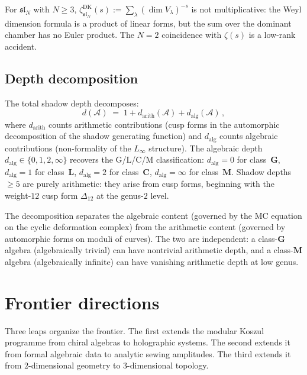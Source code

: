 \documentclass[11pt,reqno]{amsart}
\theoremstyle{definition}
\theoremstyle{remark}
\providecommand{\cA}{\mathcal{A}}
\numberwithin{equation}{section}
\begin{document}
For $\mathfrak{sl}_N$ with $N \ge 3$,
$\zeta^{\mathrm{DK}}_{\mathfrak{sl}_N}(s) :=
\sum_\lambda (\dim V_\lambda)^{-s}$ is not
multiplicative: the Weyl dimension formula is a product
of linear forms, but the sum over the dominant chamber
has no Euler product. The $N = 2$ coincidence with
$\zeta(s)$ is a low-rank accident.

\subsection{Depth decomposition}
\label{ssec:depth}

The total shadow depth decomposes:
\begin{equation}\label{eq:depth-decomposition}
d(\cA)
\;=\;
1 + d_{\mathrm{arith}}(\cA) + d_{\mathrm{alg}}(\cA)\,,
\end{equation}
where $d_{\mathrm{arith}}$ counts arithmetic contributions
(cusp forms in the automorphic decomposition of the shadow
generating function) and $d_{\mathrm{alg}}$ counts
algebraic contributions (non-formality of the $L_\infty$
structure). The algebraic depth
$d_{\mathrm{alg}} \in \{0, 1, 2, \infty\}$ recovers
the G/L/C/M classification: $d_{\mathrm{alg}} = 0$
for class~$\mathbf{G}$, $d_{\mathrm{alg}} = 1$ for
class~$\mathbf{L}$, $d_{\mathrm{alg}} = 2$ for
class~$\mathbf{C}$,
$d_{\mathrm{alg}} = \infty$ for class~$\mathbf{M}$.
Shadow depths $\ge 5$ are purely arithmetic: they arise
from cusp forms, beginning with the weight-$12$ cusp
form $\Delta_{12}$ at the genus-$2$ level.

The decomposition separates the algebraic content
(governed by the MC equation on the cyclic deformation
complex) from the arithmetic content (governed by
automorphic forms on moduli of curves). The two are
independent: a class-$\mathbf{G}$ algebra (algebraically
trivial) can have nontrivial arithmetic depth, and a
class-$\mathbf{M}$ algebra (algebraically infinite)
can have vanishing arithmetic depth at low genus.


\section{Frontier directions}
\label{sec:frontier}

Three leaps organize the frontier. The first extends the
modular Koszul programme from chiral algebras to
holographic systems. The second extends it from formal
algebraic data to analytic sewing amplitudes. The third
extends it from $2$-dimensional geometry to
$3$-dimensional topology.
\end{document}
